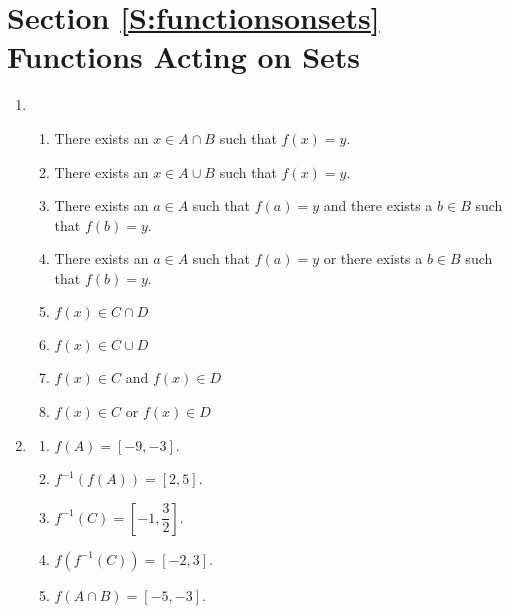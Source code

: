 \section*{Section \ref{S:functionsonsets} Functions Acting on Sets}

\begin{enumerate}
\item \begin{enumerate}
\item There exists an $x \in A \cap B$ such that $f \left( x \right) = y$.

\item There exists an $x \in A \cup B$ such that $f \left( x \right) = y$.

\item There exists an $a \in A$ such that $f \left( a \right) = y$ and there exists a 
$b \in B$ such that $f \left( b \right) = y$.

\item There exists an $a \in A$ such that $f \left( a \right) = y$ or there exists a 
$b \in B$ such that $f \left( b \right) = y$.

\item $f \left( x \right) \in C \cap D$

\item $f \left( x \right) \in C \cup D$

\item $f \left( x \right) \in C$ and $f \left( x \right) \in D$

\item $f \left( x \right) \in C$ or $f \left( x \right) \in D$
\end{enumerate}

\item \begin{multicols}{2}
\begin{enumerate}
\item $f \left( A \right) = \left[ -9, -3 \right]$.

\item $f^{-1} \left( f \left( A \right) \right) = \left[ 2, 5 \right]$.

\item $f^{-1} \left( C \right) = \left[ -1, \dfrac{3}{2} \right]$.

\item $f \left( f^{-1} \left( C \right) \right) = \left[ -2, 3 \right]$.

\item $f \left( A \cap B \right) = \left[ -5, -3 \right]$.


\end{enumerate}
\end{multicols}
\end{enumerate}
